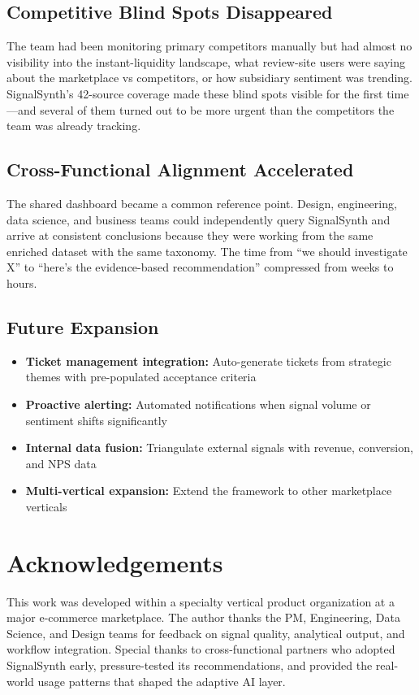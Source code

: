 \documentclass[11pt]{article}
\begin{document}
\subsection{Competitive Blind Spots Disappeared}
The team had been monitoring primary competitors manually but had almost no visibility into the instant-liquidity landscape, what review-site users were saying about the marketplace vs competitors, or how subsidiary sentiment was trending. SignalSynth's 42-source coverage made these blind spots visible for the first time---and several of them turned out to be more urgent than the competitors the team was already tracking.

\subsection{Cross-Functional Alignment Accelerated}
The shared dashboard became a common reference point. Design, engineering, data science, and business teams could independently query SignalSynth and arrive at consistent conclusions because they were working from the same enriched dataset with the same taxonomy. The time from ``we should investigate X'' to ``here's the evidence-based recommendation'' compressed from weeks to hours.

\subsection{Future Expansion}
\begin{itemize}[nosep]
    \item \textbf{Ticket management integration:} Auto-generate tickets from strategic themes with pre-populated acceptance criteria
    \item \textbf{Proactive alerting:} Automated notifications when signal volume or sentiment shifts significantly
    \item \textbf{Internal data fusion:} Triangulate external signals with revenue, conversion, and NPS data
    \item \textbf{Multi-vertical expansion:} Extend the framework to other marketplace verticals
\end{itemize}

\section*{Acknowledgements}

This work was developed within a specialty vertical product organization at a major e-commerce marketplace. The author thanks the PM, Engineering, Data Science, and Design teams for feedback on signal quality, analytical output, and workflow integration. Special thanks to cross-functional partners who adopted SignalSynth early, pressure-tested its recommendations, and provided the real-world usage patterns that shaped the adaptive AI layer.
\end{document}
